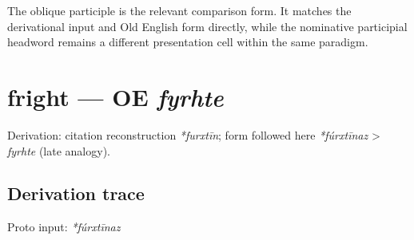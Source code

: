 \documentclass[
  british,
  a4paper,
  openany]{book}
\providecommand{\texorpdfstring}[2]{#1}
\begin{document}
The oblique participle is the relevant comparison form. It matches the
derivational input and Old English form directly, while the nominative
participial headword remains a different presentation cell within the
same paradigm.

\section{\texorpdfstring{fright --- OE
\emph{fyrhte}}{fright --- OE fyrhte}}\label{fright-oe-fyrhte}


Derivation: citation reconstruction \emph{*furxtīn}; form followed here
\emph{*fúrxtīnaz} \textgreater{} \emph{fyrhte} (late analogy).

\subsection{Derivation trace}\label{derivation-trace-113}

Proto input: \emph{*fúrxtīnaz}

\begingroup
\setlength{\fboxsep}{6pt}
\end{document}

